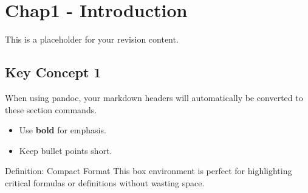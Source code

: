 \section{Chap1 - Introduction}
This is a placeholder for your revision content. 

\subsection{Key Concept 1}
When using pandoc, your markdown headers will automatically be converted to these section commands. 
\begin{itemize}
    \item Use \textbf{bold} for emphasis.
    \item Keep bullet points short.
\end{itemize}

\begin{mybox}{Definition: Compact Format}
This box environment is perfect for highlighting critical formulas or definitions without wasting space.
\end{mybox}
